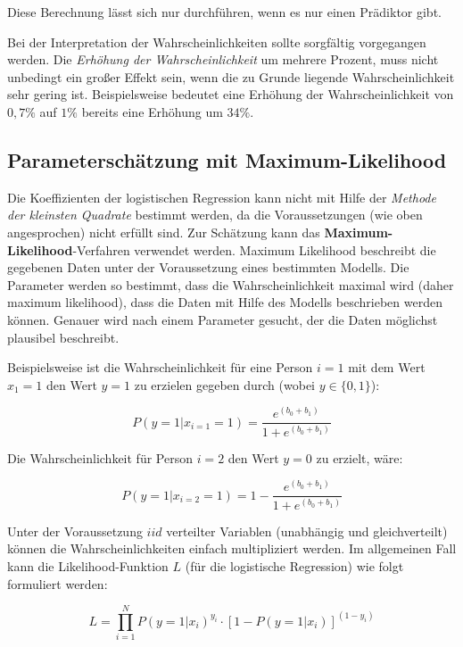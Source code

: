 \documentclass{article}
\numberwithin{equation}{section}
\begin{document}
Diese Berechnung lässt sich nur durchführen, wenn es nur einen Prädiktor gibt.

Bei der Interpretation der Wahrscheinlichkeiten sollte sorgfältig vorgegangen werden. Die \emph{Erhöhung der Wahrscheinlichkeit} um mehrere Prozent, muss nicht unbedingt ein großer Effekt sein, wenn die zu Grunde liegende Wahrscheinlichkeit sehr gering ist. Beispielsweise bedeutet eine Erhöhung der Wahrscheinlichkeit von $0,7\%$ auf $1\%$ bereits eine Erhöhung um $34\%$.

\subsection{Parameterschätzung mit Maximum-Likelihood}

Die Koeffizienten der logistischen Regression kann nicht mit Hilfe der \emph{Methode der kleinsten Quadrate} bestimmt werden, da die Voraussetzungen (wie oben angesprochen) nicht erfüllt sind. Zur Schätzung kann das \textbf{Maximum-Likelihood}-Verfahren verwendet werden. Maximum Likelihood beschreibt die gegebenen Daten unter der Voraussetzung eines bestimmten Modells. Die Parameter werden so bestimmt, dass die Wahrscheinlichkeit maximal wird (daher maximum likelihood), dass die Daten mit Hilfe des Modells beschrieben werden können. Genauer wird nach einem Parameter gesucht, der die Daten möglichst plausibel beschreibt.

Beispielsweise ist die Wahrscheinlichkeit für eine Person $i=1$ mit dem Wert $x_1=1$ den Wert $y=1$ zu erzielen gegeben durch (wobei $y \in \{ 0,1 \}$):

\begin{equation}
P(y=1 | x_{i=1} = 1) = \frac{e^{(b_0+b_1)}}{1 + e^{(b_0+b_1)}}
\end{equation}

Die Wahrscheinlichkeit für Person $i=2$ den Wert $y = 0$ zu erzielt, wäre:

\begin{equation}
P(y=1 | x_{i=2} = 1) = 1 - \frac{e^{(b_0+b_1)}}{1 + e^{(b_0+b_1)}}
\end{equation}

Unter der Voraussetzung $iid$ verteilter Variablen (unabhängig und gleichverteilt) können die Wahrscheinlichkeiten einfach multipliziert werden. Im allgemeinen Fall kann die Likelihood-Funktion $L$ (für die logistische Regression) wie folgt formuliert werden:

\begin{equation}
L = \prod_{i=1}^N P(y=1|x_i)^{y_i} \cdot \left[ 1 - P(y=1|x_i) \right]^{(1-y_i)}
\end{equation}
\end{document}
